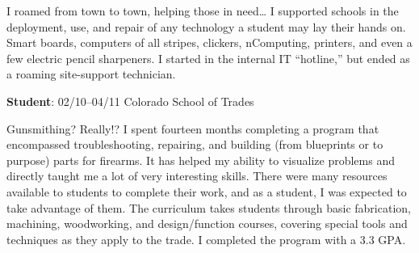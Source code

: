 \documentclass[letterpaper,12pt]{article}
\begin{document}
I roamed from town to town, helping those in need\ldots{} I supported schools in
the deployment, use, and repair of any technology a student may lay their hands
on. Smart boards, computers of all stripes, clickers, nComputing, printers, and
even a few electric pencil sharpeners. I started in the internal IT ``hotline,''
but ended as a roaming site-support technician.

\begin{flushleft}
\textbf{Student}: 02/10--04/11 Colorado School of Trades
\end{flushleft}

Gunsmithing? Really!? I spent fourteen months completing a program that
encompassed troubleshooting, repairing, and building (from blueprints or to
purpose) parts for firearms. It has helped my ability to visualize problems
and directly taught me a lot of very interesting skills. There were many
resources available to students to complete their work, and as a student, I
was expected to take advantage of them. The curriculum takes students through
basic fabrication, machining, woodworking, and design/function courses,
covering special tools and techniques as they apply to the trade. I completed
the program with a 3.3 GPA.
\end{document}
